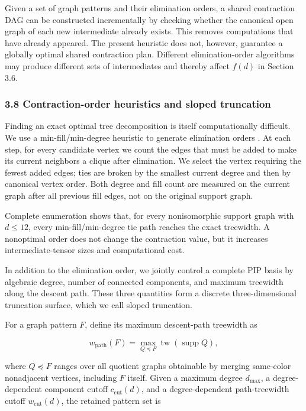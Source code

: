 Given a set of graph patterns and their elimination orders, a shared contraction DAG can be constructed incrementally by checking whether the canonical open graph of each new intermediate already exists. This removes computations that have already appeared. The present heuristic does not, however, guarantee a globally optimal shared contraction plan. Different elimination-order algorithms may produce different sets of intermediates and thereby affect \(f(d)\) in Section 3.6.


\subsubsection{3.8 Contraction-order heuristics and sloped truncation}\label{sec:sloped-truncation}

Finding an exact optimal tree decomposition is itself computationally difficult. We use a min-fill/min-degree heuristic to generate elimination orders \cite{Bodlaender2010Treewidth}. At each step, for every candidate vertex we count the edges that must be added to make its current neighbors a clique after elimination. We select the vertex requiring the fewest added edges; ties are broken by the smallest current degree and then by canonical vertex order. Both degree and fill count are measured on the current graph after all previous fill edges, not on the original support graph.

Complete enumeration shows that, for every nonisomorphic support graph with \(d\le12\), every min-fill/min-degree tie path reaches the exact treewidth. A nonoptimal order does not change the contraction value, but it increases intermediate-tensor sizes and computational cost.

In addition to the elimination order, we jointly control a complete PIP basis by algebraic degree, number of connected components, and maximum treewidth along the descent path. These three quantities form a discrete three-dimensional truncation surface, which we call sloped truncation.

For a graph pattern \(F\), define its maximum descent-path treewidth as

\[
w_{\mathrm{path}}(F)
=
\max_{Q\preceq F}
\operatorname{tw}\!\left(\operatorname{supp}Q\right),
\]

where \(Q\preceq F\) ranges over all quotient graphs obtainable by merging same-color nonadjacent vertices, including \(F\) itself. Given a maximum degree \(d_{\max}\), a degree-dependent component cutoff \(c_{\mathrm{cut}}(d)\), and a degree-dependent path-treewidth cutoff \(w_{\mathrm{cut}}(d)\), the retained pattern set is

